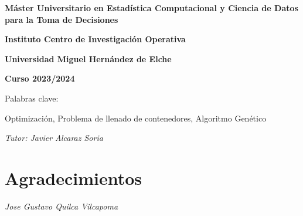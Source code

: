 \documentclass[openany]{article}
\begin{document}
\begin{titlepage}
    {\flushleft \Large \bfseries Máster Universitario en Estadística Computacional y Ciencia de Datos para la Toma de Decisiones\par}\vspace{0.cm}
    {\flushleft \Large \bfseries Instituto Centro de Investigación Operativa\par}\vspace{0.cm}
    {\flushleft \Large \bfseries Universidad Miguel Hernández de Elche\par}\vspace{0.cm}
    {\flushleft \small \bfseries Curso 2023/2024\par}\vspace{1.5cm}

    {\flushleft \normalsize Palabras clave:\par}\vspace{0cm}

    {Optimización, Problema de llenado de contenedores, Algoritmo Genético \par}
    \vspace{1.5cm}

    {\flushleft \normalsize \textit{Tutor: Javier Alcaraz Soria}\\}\vspace{0cm}

\end{titlepage}

\clearpage\thispagestyle{empty}\null\newpage %

\newpage
\thispagestyle{plain}

\mbox{}\par
\vspace{4.5cm}


\clearpage\thispagestyle{empty}\null\newpage %

\newpage
\thispagestyle{plain}
\section*{Agradecimientos}

\lipsum[1]

\mbox{}\par
\vspace{0.5cm}

\begin{flushright}
    \textit{Jose Gustavo Quilca Vilcapoma}
\end{flushright}
\end{document}
